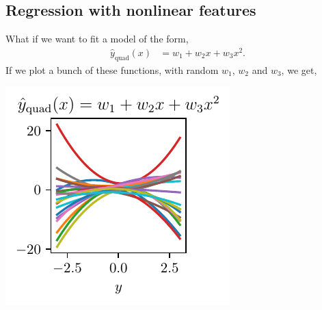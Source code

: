 \documentclass{article}
\newcommand{\yh}{\hat{y}}
\begin{document}
\subsection{Regression with nonlinear features}

What if we want to fit a model of the form,
\begin{align}
  \label{eq:quad}
  \yh_\text{quad}(x) &= w_1 + w_2 x + w_3 x^2.
\end{align}
If we plot a bunch of these functions, with random $w_1$, $w_2$ and $w_3$, we get,
\begin{center}
\includegraphics{quad_fam.pdf}
\end{center}
\end{document}
